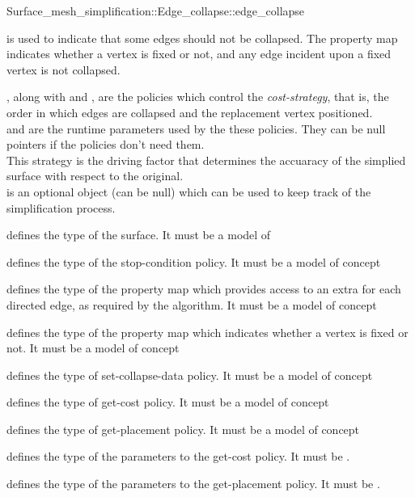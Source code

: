 \begin{ccRefFunction}{Surface_mesh_simplification::Edge_collapse::edge_collapse}
{ is used to indicate that some edges should not be
collapsed. The property map indicates whether a vertex is fixed or not,
and any edge incident upon a fixed vertex is not collapsed.

, along with  and ,
are the policies which control the {\em cost-strategy}, that is, 
the order in which edges are collapsed and the replacement vertex positioned.\\
 and  are the runtime 
parameters used by the these policies. They can be null pointers
if the policies don't need them.\\
This strategy is the driving factor that determines the accuaracy of the
simplied surface with respect to the original.\\

 is an optional object (can be null) which can be used
to keep track of the simplification process.
}


 defines the type of the surface.
It must be a model of 

 defines the type of the stop-condition policy.
It must be a model of  concept

 defines the type of the property map which 
provides access to an extra  for each directed edge,
as required by the algorithm.
It must be a model of  concept

 defines the type of the property map which 
indicates whether a vertex is fixed or not.
It must be a model of  concept

 defines the type of set-collapse-data policy.
It must be a model of  concept

 defines the type of get-cost policy.
It must be a model of  concept

 defines the type of get-placement policy.
It must be a model of  concept

 defines the type of the parameters to the get-cost policy.
It must be .

 defines the type of the parameters to the get-placement policy.
It must be .


\end{ccRefFunction}

